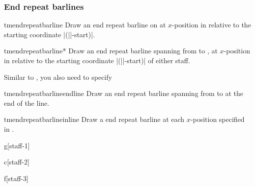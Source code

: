 \documentclass[11pt,a4paper]{ltxdoc}
\begin{document}
\subsubsection{End repeat barlines}\label{sec:multistaff:barlines:end}
\begin{docCommand}{tmendrepeatbarline}{}
  Draw an end repeat barline on  at $x$-position  in 
  relative to the starting coordinate |(||-start)|.
\end{docCommand}
\begin{docCommand}{tmendrepeatbarline*}{}
  Draw an end repeat barline spanning from  to 
  , at $x$-position  in relative to 
  the starting coordinate |(||-start)| of either staff.

  Similar to , you also need to specify 
\end{docCommand}
\begin{docCommand}{tmendrepeatbarlineendline}{}
  Draw an end repeat barline spanning from  to 
   at the end of the line. 
\end{docCommand}
\begin{docCommand}{tmendrepeatbarlineinline}{}
  Draw a end repeat barline at each $x$-position specified in .
\end{docCommand}
\begin{dispExample}
\begin{tmmultiplestaves}[0pt]%
  \begin{tmstaff}{g}[staff-1]
  \end{tmstaff}%
  \begin{tmstaff}{c}[staff-2]
  \end{tmstaff}%
  \begin{tmstaff}{f}[staff-3]
  \end{tmstaff}%
\end{tmmultiplestaves}
\end{dispExample}
\end{document}
